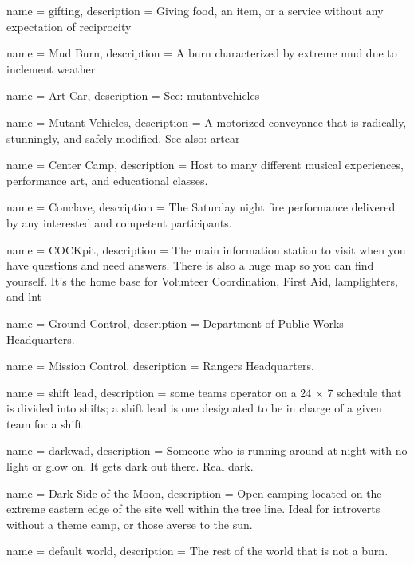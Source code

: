  {
name = {gifting},
description = {Giving food, an item, or a service without any expectation of reciprocity}
}

 {
name = {Mud Burn},
description = {A burn characterized by extreme mud due to inclement weather}
}

 {
name = {Art Car},
description = {See: \gls{mutantvehicles}}
}

 {
name = {Mutant Vehicles},
description = {A motorized conveyance that is radically, stunningly, and safely modified. See also: \gls{artcar}}
}

 {
name = {Center Camp},
description = {Host to many different musical experiences, performance art, and educational classes.}
}

 {
name = {Conclave},
description = {The Saturday night fire performance delivered by any interested and competent participants.}
}

 {
name = {COCKpit},
description = {The main information station to visit when you have questions and need answers. There is also a huge map so you can find yourself. It's the home base for Volunteer Coordination, First Aid, \gls{lamplighters}, and \gls{lnt}}
}

 {
name = {Ground Control},
description = {Department of Public Works Headquarters.}
}

 {
name = {Mission Control},
description = {Rangers Headquarters.}
}

 {
name = {shift lead},
description = {some teams operator on a 24 $\times$ 7 schedule that is divided into shifts; a shift lead is one designated to be in charge of a given team for a shift}
}


 {
name = {darkwad},
description = {Someone who is running around at night with no light or glow on. It gets dark out there. Real dark.}
}

 {
name = {Dark Side of the Moon},
description = {Open camping located on the extreme eastern edge of the site well within the tree line.  Ideal for introverts without a theme camp, or those averse to the sun.}
}

 {
name = {default world},
description = {The rest of the world that is not a burn.}
}

